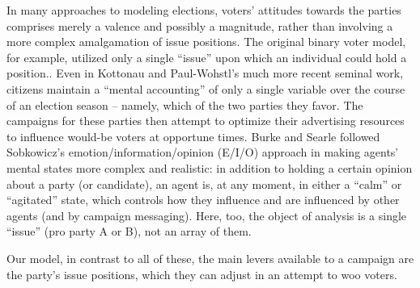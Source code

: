 

In many approaches to modeling elections, voters' attitudes towards the parties
comprises merely a valence and possibly a magnitude, rather than involving a
more complex amalgamation of issue positions. The original binary voter model,
for example, utilized only a single ``issue'' upon which an individual could
hold a position.\cite{holley_ergodic_1975,clifford_model_1973}. Even in
Kottonau and Paul-Wohstl's much more recent seminal
work\cite{kottonau_simulating_2004}, citizens maintain a ``mental accounting''
of only a single variable over the course of an election season -- namely,
which of the two parties they favor. The campaigns for these parties then
attempt to optimize their advertising resources to influence would-be voters at
opportune times. Burke and Searle\cite{burke_quantitatively_2022} followed
Sobkowicz's emotion/information/opinion (E/I/O)
approach\cite{sobkowicz_quantitative_2016} in making agents' mental states more
complex and realistic: in addition to holding a certain opinion about a party
(or candidate), an agent is, at any moment, in either a ``calm'' or
``agitated'' state, which controls how they influence and are influenced by
other agents (and by campaign messaging). Here, too, the object of analysis is
a single ``issue'' (pro party A or B), not an array of them.

Our model, in contrast to all of these, the main levers available to a campaign
are the party's issue positions, which they can adjust in an attempt to woo
voters.





